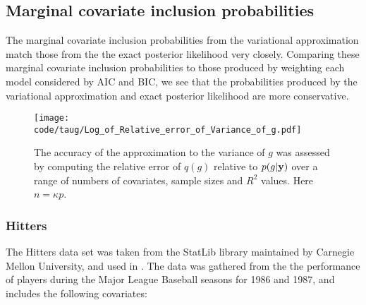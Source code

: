 \documentclass{amsart}[12pt]
\begin{document}
\subsection{Marginal covariate inclusion probabilities}

The marginal covariate inclusion probabilities from the variational approximation match those from the the
exact posterior likelihood very closely. Comparing these marginal covariate inclusion probabilities to those
produced by weighting each model considered by AIC and BIC, we see that the probabilities produced by the
variational approximation and exact posterior likelihood are more conservative.

\begin{figure}[p]
	\texttt{[image: code/taug/Log\_of\_Relative\_error\_of\_Variance\_of\_g.pdf]}
	\caption{The accuracy of the approximation to the variance of $g$ was assessed by computing the relative
		error of $q(g)$ relative to $p(g | {\bf y})$ over a range
		of numbers of covariates, sample sizes and $R^2$  values. Here $n = \kappa p$.}
	\label{fig:rel_error_var_g}
\end{figure}





\subsubsection{Hitters}

The Hitters data set was taken from the StatLib library maintained by Carnegie Mellon University, and used in
\citep{James:2014:ISL:2517747}. The data was gathered from the the performance of players during the Major
League Baseball seasons for 1986 and 1987, and includes the following covariates:
\end{document}
